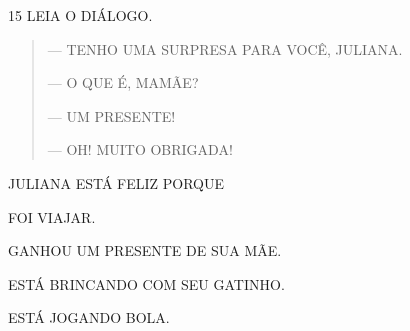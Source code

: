 \num{15} LEIA O DIÁLOGO. %



\begin{quote}
— TENHO UMA SURPRESA PARA VOCÊ, JULIANA.

— O QUE É, MAMÃE?

— UM PRESENTE!

— OH! MUITO OBRIGADA!
\end{quote}

JULIANA ESTÁ FELIZ PORQUE

\begin{escolha}
\item FOI VIAJAR.

\item GANHOU UM PRESENTE DE SUA MÃE.

\item ESTÁ BRINCANDO COM SEU GATINHO.

\item ESTÁ JOGANDO BOLA.
\end{escolha}



